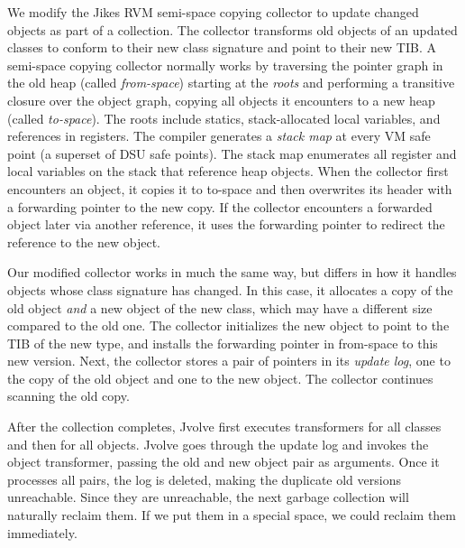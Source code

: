 \documentclass[9pt]{sigplanconf}
\newcommand{\DSU}{{\sc Jvolve}}
\newcommand{\JikesRVM}{Jikes RVM}
\begin{document}
We modify the \JikesRVM{}
semi-space copying collector \cite{BCM:04} to 
update changed objects as part of a collection. 
The collector transforms old objects of an updated classes to conform
to their new class signature and point to their new TIB.
A semi-space copying collector normally works by traversing the
pointer graph in the old heap (called \emph{from-space}) starting at
the \emph{roots} and performing a transitive closure over the object
graph, copying all objects it encounters to a new heap (called
\emph{to-space}).  The roots include statics, stack-allocated local variables, and references in registers.  The compiler generates a
\emph{stack map} at every VM safe point (a superset of DSU safe
points).  The stack map enumerates all register and local variables on
the stack that reference heap objects.  When the collector first
encounters an object, it copies it to to-space and then overwrites
its header with a forwarding pointer to the new copy.  If the
collector encounters a forwarded object later via another reference,
it uses the forwarding pointer to redirect the reference to the new
object.

Our modified collector works in much the same way, but differs in how
it handles objects whose class signature has changed.  In this case,
it allocates a copy of the old object \emph{and} a new object of the new
class, which may have a different size compared to the old one. The collector
initializes the new object to point to the TIB of the new type, and
installs the forwarding pointer in from-space to this new version. Next,
the collector stores a pair of pointers in its \emph{update log}, one
to the copy of the old object and one to the 
new object.  The collector continues scanning the old copy.

After the collection completes, \DSU{} first executes transformers for all
classes and then for all objects. 
\DSU{} goes
through the update log and invokes the object transformer, passing
the old and new object pair as arguments.  Once it processes all
pairs, the log is deleted, making the  duplicate
old versions unreachable.  
Since they are unreachable, the next garbage collection will naturally
reclaim them.  If we put them in a special space, we could reclaim
them immediately.%
\end{document}
